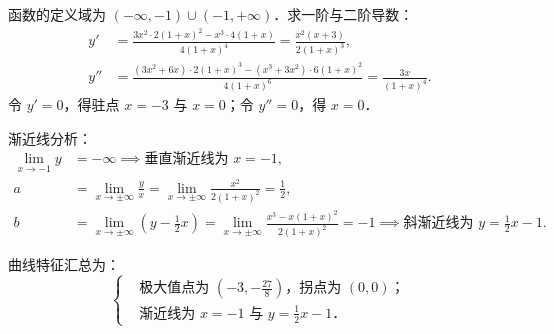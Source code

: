 \begin{solution}
\begin{center}
    \end{center}


    函数的定义域为 $(-\infty, -1) \cup (-1, +\infty)$．求一阶与二阶导数：
    \begin{equation}
        \begin{aligned}
            y'  & = \frac{3x^2 \cdot 2(1+x)^2 - x^3 \cdot 4(1+x)}{4(1+x)^4} = \frac{x^2(x+3)}{2(1+x)^3},        \\
            y'' & = \frac{(3x^2+6x) \cdot 2(1+x)^3 - (x^3+3x^2) \cdot 6(1+x)^2}{4(1+x)^6} = \frac{3x}{(1+x)^4}.
        \end{aligned}
    \end{equation}
    令 $y' = 0$，得驻点 $x = -3$ 与 $x = 0$；令 $y'' = 0$，得 $x = 0$．

    渐近线分析：
    \begin{equation}
        \begin{aligned}
            \lim_{x \to -1} y & = -\infty \implies \text{垂直渐近线为 } x = -1,                                                                                                                           \\
            a                 & = \lim_{x \to \pm\infty} \frac{y}{x} = \lim_{x \to \pm\infty} \frac{x^2}{2(1+x)^2} = \frac{1}{2},                                                                   \\
            b                 & = \lim_{x \to \pm\infty} \left( y - \frac{1}{2}x \right) = \lim_{x \to \pm\infty} \frac{x^3 - x(1+x)^2}{2(1+x)^2} = -1 \implies \text{斜渐近线为 } y = \frac{1}{2}x - 1.
        \end{aligned}
    \end{equation}

    曲线特征汇总为：
    \begin{equation}
        \boxed{
            \left\{
            \begin{aligned}
                 & \text{极大值点为 } \left(-3, -\frac{27}{8}\right)\text{，拐点为 } (0, 0)\text{；} \\
                 & \text{渐近线为 } x = -1 \text{ 与 } y = \frac{1}{2}x - 1\text{．}
            \end{aligned}
            \right.
        }
    \end{equation}


\end{solution}
